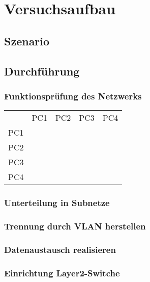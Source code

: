 \newpage
\section{Versuchsaufbau}

    \subsection{Szenario}

    \newpage
    \subsection{Durchführung}

        \subsubsection{Funktionsprüfung des Netzwerks}
        \begin{table}[H]
        \centering
        \begin{tabular}{l|l|l|l|l|}
        \multicolumn{1}{l}{} & \multicolumn{1}{l}{PC1} & \multicolumn{1}{l}{PC2} & \multicolumn{1}{l}{PC3} & \multicolumn{1}{l}{PC4}  \\ 
        \cline{2-5}
        PC1                              &                         &                         &                         &                          \\ 
        \cline{2-5}
        PC2                              &                         &                         &                         &                          \\ 
        \cline{2-5}
        PC3                              &                         &                         &                         &                          \\ 
        \cline{2-5}
        PC4                              &                         &                         &                         &                          \\
        \cline{2-5}
        \end{tabular}
        \end{table}


        \newpage
        \subsubsection{Unterteilung in Subnetze}

        \newpage
        \subsubsection{Trennung durch VLAN herstellen}

        \newpage
        \subsubsection{Datenaustausch realisieren}

        \newpage
        \subsubsection{Einrichtung Layer2-Switche}